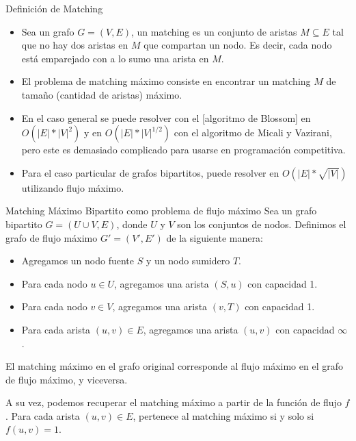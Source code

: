 \documentclass{beamer}
\begin{document}
    \begin{frame}{Definición de Matching}
        \begin{itemize}
        \item Sea un grafo $G = (V,E)$, un matching es un conjunto de aristas $M \subseteq E$ tal que no hay dos aristas en $M$ que compartan un nodo. Es decir, cada nodo está emparejado con a lo sumo una arista en $M$.

        \item El problema de matching máximo consiste en encontrar un matching $M$ de tamaño (cantidad de aristas) máximo.

        \item En el caso general se puede resolver con el  \href{https://en.wikipedia.org/wiki/Blossom_algorithm}[algoritmo de Blossom] en $O(|E|*|V|^2)$ y en $O(|E|*|V|^{1/2})$ con el algoritmo de Micali y Vazirani, pero este es demasiado complicado para usarse en programación competitiva.

        \item Para el caso particular de grafos bipartitos, puede resolver en $O(|E|*\sqrt{|V|})$ utilizando flujo máximo.
        \end{itemize}
    \end{frame}
    
    

    \begin{frame}{Matching Máximo Bipartito como problema de flujo máximo}
        Sea un grafo bipartito $G = (U \cup V, E)$, donde $U$ y $V$ son los conjuntos de nodos. Definimos el grafo de flujo máximo $G' = (V', E')$ de la siguiente manera:
        \begin{itemize}
            \item Agregamos un nodo fuente $S$ y un nodo sumidero $T$.
            \item Para cada nodo $u \in U$, agregamos una arista $(S,u)$ con capacidad 1.
            \item Para cada nodo $v \in V$, agregamos una arista $(v,T)$ con capacidad 1.
            \item Para cada arista $(u,v) \in E$, agregamos una arista $(u,v)$ con capacidad $\infty$.
        \end{itemize}

        El matching máximo en el grafo original corresponde al flujo máximo en el grafo de flujo máximo, y viceversa.
        
        A su vez, podemos recuperar el matching máximo a partir de la función de flujo $f$. Para cada arista $(u,v) \in E$, pertenece al matching máximo si y solo si $f(u,v) = 1$.
    \end{frame}
\end{document}
